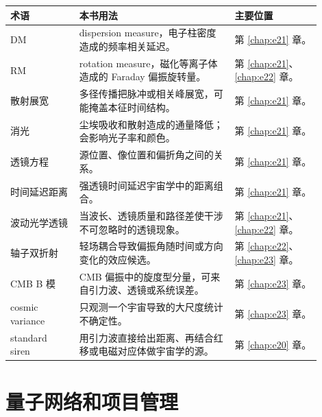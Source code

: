 \begin{longtable}{p{0.20\linewidth}p{0.45\linewidth}p{0.25\linewidth}}
\toprule
术语 & 本书用法 & 主要位置 \\
\midrule
DM & dispersion measure，电子柱密度造成的频率相关延迟。 & 第 \ref{chap:e21} 章。 \\
RM & rotation measure，磁化等离子体造成的 Faraday 偏振旋转量。 & 第 \ref{chap:e21}、\ref{chap:e22} 章。 \\
散射展宽 & 多径传播把脉冲或相关峰展宽，可能掩盖本征时间结构。 & 第 \ref{chap:e21} 章。 \\
消光 & 尘埃吸收和散射造成的通量降低；会影响光子率和颜色。 & 第 \ref{chap:e21} 章。 \\
透镜方程 & 源位置、像位置和偏折角之间的关系。 & 第 \ref{chap:e21} 章。 \\
时间延迟距离 & 强透镜时间延迟宇宙学中的距离组合。 & 第 \ref{chap:e21} 章。 \\
波动光学透镜 & 当波长、透镜质量和路径差使干涉不可忽略时的透镜现象。 & 第 \ref{chap:e21}、\ref{chap:e22} 章。 \\
轴子双折射 & 轻场耦合导致偏振角随时间或方向变化的效应候选。 & 第 \ref{chap:e22}、\ref{chap:e23} 章。 \\
CMB B 模 & CMB 偏振中的旋度型分量，可来自引力波、透镜或系统误差。 & 第 \ref{chap:e23} 章。 \\
cosmic variance & 只观测一个宇宙导致的大尺度统计不确定性。 & 第 \ref{chap:e23} 章。 \\
standard siren & 用引力波直接给出距离、再结合红移或电磁对应体做宇宙学的源。 & 第 \ref{chap:e20} 章。 \\
\bottomrule
\end{longtable}

\section{量子网络和项目管理}
\label{appsec:c-program}

